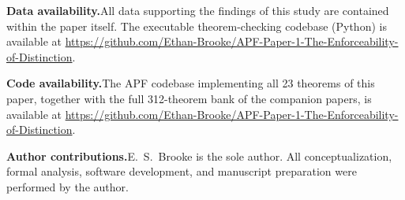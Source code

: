 \documentclass[11pt]{article}
\begin{document}
\textbf{Data availability.}\enspace All data supporting the findings of this study are contained within the paper itself.  The executable theorem-checking codebase (Python) is available at \url{https://github.com/Ethan-Brooke/APF-Paper-1-The-Enforceability-of-Distinction}.

\textbf{Code availability.}\enspace The APF codebase implementing all 23 theorems of this paper, together with the full 312-theorem bank of the companion papers, is available at \url{https://github.com/Ethan-Brooke/APF-Paper-1-The-Enforceability-of-Distinction}.

\textbf{Author contributions.}\enspace E.\ S.\ Brooke is the sole author.  All conceptualization, formal analysis, software development, and manuscript preparation were performed by the author.


\end{document}
